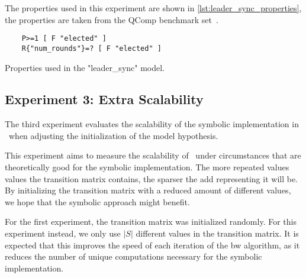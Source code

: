 The properties used in this experiment are shown in \autoref{lst:leader_sync_properties}, the properties are taken from the QComp benchmark set~\cite{hartmanns2019quantitative}.


\begin{listing}[htb!]
    \begin{verbatim}
    P>=1 [ F "elected" ]
    R{"num_rounds"}=? [ F "elected" ]
    \end{verbatim}
    \caption{Properties used in the "leader\_sync" model.}
    \label{lst:leader_sync_properties}
\end{listing}


\subsection{Experiment 3: Extra Scalability}\label{sec:exp_extra_scalability}
The third experiment evaluates the scalability of the symbolic implementation in \JajapyTwo\ when adjusting the initialization of the model hypothesis.

This experiment aims to measure the scalability of \JajapyTwo\ under circumstances that are theoretically good for the symbolic implementation.
The more repeated values values the transition matrix contains, the sparser the \gls{add} representing it will be.
By initializing the transition matrix with a reduced amount of different values, we hope that the symbolic approach might benefit.

For the first experiment, the transition matrix was initialized randomly.
For this experiment instead, we only use $|S|$ different values in the transition matrix.
It is expected that this improves the speed of each iteration of the \gls{bw} algorithm, as it reduces the number of unique computations necessary for the symbolic implementation.



